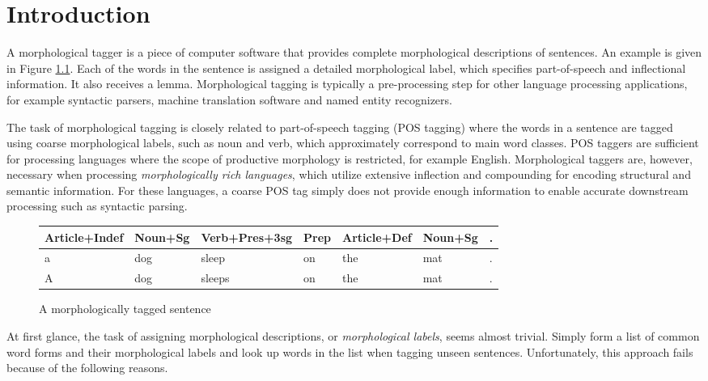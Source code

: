 \chapter{Introduction}
\label{ch:intro}

A morphological tagger is a piece of computer software that provides
complete morphological descriptions of sentences. An example is given
in Figure \ref{fig:mt-example}. Each of the words in the sentence is
assigned a detailed morphological label, which specifies
part-of-speech and inflectional information. It also receives a
lemma. Morphological tagging is typically a pre-processing step for
other language processing applications, for example syntactic parsers,
machine translation software and named entity recognizers.

The task of morphological tagging is closely related to part-of-speech
tagging (POS tagging) where the words in a sentence are tagged using
coarse morphological labels, such as noun and verb, which
approximately correspond to main word classes. POS taggers are
sufficient for processing languages where the scope of productive
morphology is restricted, for example English. Morphological taggers
are, however, necessary when processing {\it morphologically rich
  languages}, which utilize extensive inflection and compounding for
encoding structural and semantic information. For these languages, a
coarse POS tag simply does not provide enough information to enable
accurate downstream processing such as syntactic parsing.

\begin{figure}[!htb]
\begin{center}
\begin{tabular}{|l|l|l|l|l|l|l|}
\hline
Article+Indef & Noun+Sg & Verb+Pres+3sg & Prep & Article+Def & Noun+Sg & .\\  
\hline
a & dog & sleep & on & the & mat & .\\
\hline
A & dog & sleeps & on & the & mat & .\\
\hline
\end{tabular}
\end{center}
\caption{A morphologically tagged sentence}\label{fig:mt-example}
\end{figure}

At first glance, the task of assigning morphological descriptions, or
{\it morphological labels}, seems almost trivial. Simply form a list of
common word forms and their morphological labels and look up words in
the list when tagging unseen sentences. Unfortunately, this approach
fails because of the following reasons.

